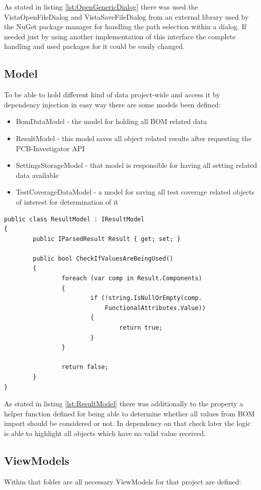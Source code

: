 As stated in listing \ref{lst:OpenGenericDialog} there was used the VistaOpenFileDialog and VistaSaveFileDialog from an external library used by the NuGet package manager for handling the path selection within a dialog. If needed just by using another implementation of this interface the complete handling and used packages for it could be easily changed.\newpage

		\subsection{Model}
To be able to hold different kind of data project-wide and access it by dependency injection in easy way there are some models been defined:
\begin{itemize}
	\item BomDataModel - the model for holding all \ac{BOM} related data
	\item ResultModel - this model saves all object related results after requesting the \ac{PCB}-Investigator \ac{API}
	\item SettingsStorageModel - that model is responsible for having all setting related data available
	\item TestCoverageDataModel - a model for saving all test coverage related objects of interest for determination of it
\end{itemize}

\begin{lstlisting}[language={[Sharp]C},caption={ResultModel},captionpos=b,label=lst:ResultModel]
public class ResultModel : IResultModel
{
		public IParsedResult Result { get; set; }

		public bool CheckIfValuesAreBeingUsed()
		{
				foreach (var comp in Result.Components)
				{
						if (!string.IsNullOrEmpty(comp.
							FunctionalAttributes.Value))
						{
								return true;
						}
				}

				return false;
		}
}
\end{lstlisting}

As stated in listing \ref{lst:ResultModel} there was additionally to the property a helper function defined for being able to determine whether all values from \ac{BOM} import should be considered or not. In dependency on that check later the logic is able to highlight all objects which have no valid value received.

		\subsection{ViewModels}
Within that folder are all necessary ViewModels for that project are defined:

